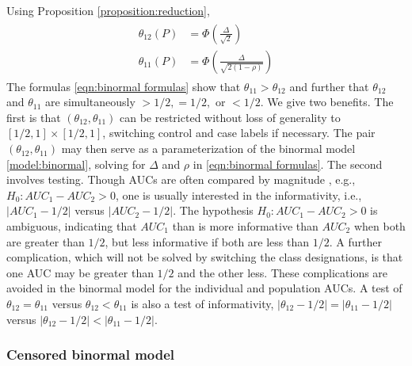 \documentclass[12pt]{article}
\DeclareMathOperator{\AUC}{AUC}
\newcommand{\cind}{\perp \!\!\! \perp}
\newcommand{\aucindiv}{\theta_{11}}%
\newcommand{\aucpop}{\theta_{12}}%
\newcommand{\comment}[1]{
  \iftoggle{commenttoggle}{
    {\normalsize{\color{red}{ #1}}\normalsize}
  }
  {}
}
\begin{document}
Using Proposition \ref{proposition:reduction},
\begin{gather}
  \begin{aligned}
  \aucpop(P) &= \Phi\left(\frac{\Delta}{\sqrt{2}}\right)\\
  \aucindiv(P) &=  \Phi\left(\frac{\Delta}{\sqrt{2(1-\rho)}}\right)\label{eqn:binormal formulas}
\end{aligned}
\end{gather}
The formulas \eqref{eqn:binormal formulas} show that $\aucindiv>\aucpop$ and further that $\aucpop$ and
$\aucindiv$ are simultaneously $>1/2,=1/2,$ or $<1/2$. We give two benefits. The
first is that $(\aucpop,\aucindiv)$ can be restricted without loss of
generality to $[1/2,1]\times[1/2,1]$, switching control and case labels if necessary. The pair $(\aucpop,\aucindiv)$  may then serve as a
parameterization of the binormal model \eqref{model:binormal}, solving for $\Delta$ and $\rho$ in \eqref{eqn:binormal formulas}.  The
second involves testing. Though AUCs are often compared by magnitude%
, e.g., $H_0:AUC_1-AUC_2>0$, one is
usually interested in the informativity, i.e., $|AUC_1-1/2|$ versus
$|AUC_2-1/2|$. The hypothesis $H_0:AUC_1-AUC_2>0$ is ambiguous, indicating that
$AUC_1$ than is more informative than $AUC_2$ when both are greater than $1/2$, but less
informative if both are less than $1/2$.  A further complication, which will not
be solved by switching the class designations, is
that one AUC may be greater than $1/2$ and the other less. These complications are
avoided in the binormal model for the individual and population
AUCs. A test of $\aucpop=\aucindiv$ versus $\aucpop<\aucindiv$ is also a test of
informativity, $|\aucpop-1/2|=|\aucindiv-1/2|$ versus $|\aucpop-1/2|<|\aucindiv-1/2|$.

\subsubsection{Censored binormal model}
\end{document}
